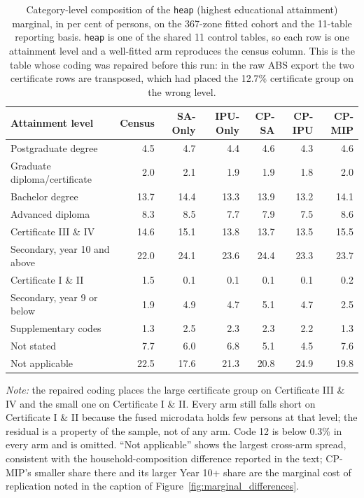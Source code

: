 \documentclass[review]{elsarticle}
\begin{document}
\begin{table}[h!]
\centering
\caption{Category-level composition of the \texttt{heap} (highest educational attainment)
marginal, in per cent of persons, on the 367-zone fitted cohort and the 11-table reporting
basis. \texttt{heap} is one of the shared 11 control tables, so each row is one attainment
level and a well-fitted arm reproduces the census column. This is the table whose coding was
repaired before this run: in the raw ABS export the two certificate rows are transposed,
which had placed the 12.7\% certificate group on the wrong level.}
\label{tab:heap_categories}
\footnotesize
\setlength{\tabcolsep}{3pt}
\begin{tabular}{@{}lrrrrrr@{}}
\toprule
\textbf{Attainment level} & \textbf{Census} & \textbf{SA-Only} & \textbf{IPU-Only} &
\textbf{CP-SA} & \textbf{CP-IPU} & \textbf{CP-MIP} \\
\midrule
Postgraduate degree              &  4.5 &  4.7 &  4.4 &  4.6 &  4.3 &  4.6 \\
Graduate diploma/certificate     &  2.0 &  2.1 &  1.9 &  1.9 &  1.8 &  2.0 \\
Bachelor degree                  & 13.7 & 14.4 & 13.3 & 13.9 & 13.2 & 14.1 \\
Advanced diploma                 &  8.3 &  8.5 &  7.7 &  7.9 &  7.5 &  8.6 \\
Certificate III \& IV            & 14.6 & 15.1 & 13.8 & 13.7 & 13.5 & 15.5 \\
Secondary, year 10 and above     & 22.0 & 24.1 & 23.6 & 24.4 & 23.3 & 23.7 \\
Certificate I \& II              &  1.5 &  0.1 &  0.1 &  0.1 &  0.1 &  0.2 \\
Secondary, year 9 or below       &  1.9 &  4.9 &  4.7 &  5.1 &  4.7 &  2.5 \\
Supplementary codes              &  1.3 &  2.5 &  2.3 &  2.3 &  2.2 &  1.3 \\
Not stated                       &  7.7 &  6.0 &  6.8 &  5.1 &  4.5 &  7.6 \\
Not applicable                   & 22.5 & 17.6 & 21.3 & 20.8 & 24.9 & 19.8 \\
\bottomrule
\end{tabular}
\end{table}
{\footnotesize\textit{Note:} the repaired coding places the large certificate group on
Certificate III \& IV and the small one on Certificate I \& II. Every arm still falls
short on Certificate I \& II because the fused microdata holds few persons at that level;
the residual is a property of the sample, not of any arm. Code 12 is below 0.3\% in every
arm and is omitted. ``Not applicable'' shows the largest cross-arm spread, consistent with
the household-composition difference reported in the text; CP-MIP's smaller share there and
its larger Year 10+ share are the marginal cost of replication noted in the caption of
Figure~\ref{fig:marginal_differences}.}
\end{document}
